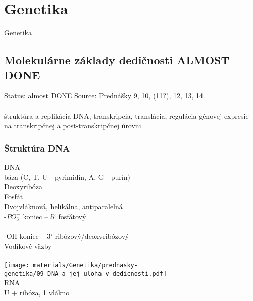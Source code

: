 \chapter[Genetika]{Genetika}
\label{genetika} %

Genetika

\section{Molekulárne základy dedičnosti ALMOST DONE}

Status: almost DONE
Source: Prednášky 9, 10, (11?), 12, 13, 14\\
\\
štruktúra a replikácia DNA, transkripcia, translácia, regulácia génovej expresie na transkripčnej a post-transkripčnej úrovni. \\
\subsection{Štruktúra DNA}
DNA\\
\tab báza (C, T, U - pyrimidín, A, G - purín) \\
\tab Deoxyribóza\\
\tab Fosfát\\
\tab Dvojvláknová, helikálna, antiparalelná\\
\tab -$PO_3^-$ koniec -- 5` fosfátový\\\\
\tab -OH koniec -- 3` ribózový/deoxyribózový\\
\tab Vodíkové väzby\\
\\
\texttt{[image: materials/Genetika/prednasky-genetika/09\_DNA\_a\_jej\_uloha\_v\_dedicnosti.pdf]}
\\
RNA\\
\tab U + ribóza, 1 vlákno\\
\\
